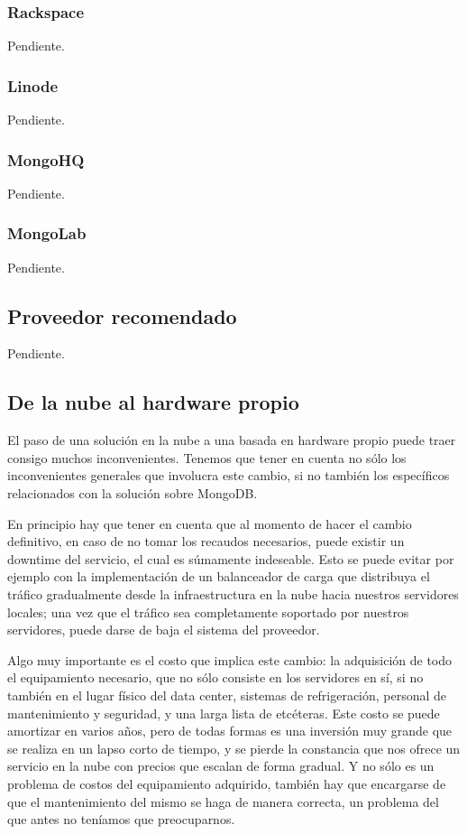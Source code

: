 \documentclass[a4paper,10pt,twoside]{article}
\begin{document}
\subsubsection{Rackspace}

Pendiente.


\subsubsection{Linode}

Pendiente.


\subsubsection{MongoHQ}

Pendiente.


\subsubsection{MongoLab}

Pendiente.


\subsection{Proveedor recomendado}

Pendiente.


\subsection{De la nube al hardware propio}

El paso de una solución en la nube a una basada en hardware propio puede traer consigo muchos inconvenientes. Tenemos que tener en cuenta no sólo los inconvenientes generales que involucra este cambio, si no también los específicos relacionados con la solución sobre MongoDB.

En principio hay que tener en cuenta que al momento de hacer el cambio definitivo, en caso de no tomar los recaudos necesarios, puede existir un downtime del servicio, el cual es súmamente indeseable. Esto se puede evitar por ejemplo con la implementación de un balanceador de carga que distribuya el tráfico gradualmente desde la infraestructura en la nube hacia nuestros servidores locales; una vez que el tráfico sea completamente soportado por nuestros servidores, puede darse de baja el sistema del proveedor.

Algo muy importante es el costo que implica este cambio: la adquisición de todo el equipamiento necesario, que no sólo consiste en los servidores en sí, si no también en el lugar físico del data center, sistemas de refrigeración, personal de mantenimiento y seguridad, y una larga lista de etcéteras. Este costo se puede amortizar en varios años, pero de todas formas es una inversión muy grande que se realiza en un lapso corto de tiempo, y se pierde la constancia que nos ofrece un servicio en la nube con precios que escalan de forma gradual. Y no sólo es un problema de costos del equipamiento adquirido, también hay que encargarse de que el mantenimiento del mismo se haga de manera correcta, un problema del que antes no teníamos que preocuparnos.
\end{document}
